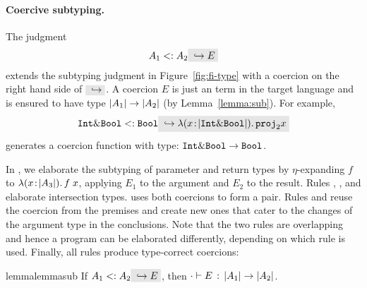 
\paragraph{Coercive subtyping.}

The judgment
\[
A_1 \subtype A_2 \yields E
\]
extends the subtyping judgment in Figure~\ref{fig:fi-type} with a coercion
on the right hand side of $ \yields {} $. A coercion $ E $ is just an term
in the target language and is ensured to have type
$ \lvert A_1 \rvert \to \lvert A_2 \rvert $ (by Lemma~\ref{lemma:sub}). For example,
\[
\code{Int} \inter \code{Bool} \subtype \code{Bool} \yields {\lamty x {\im {\code{Int} \inter \code{Bool}}} {\proj 2 x}}
\]
generates a coercion function with type: $\texttt{Int} \& \texttt{Bool} \to \texttt{Bool}$.

In , we elaborate the subtyping of
parameter and return types by $\eta$-expanding $f$ to $\lambda (x \!:\! \lvert A_3 \rvert).\, f \; x$, applying $E_1$ to the argument and $E_2$ to the result. Rules
, , and
 elaborate intersection types.
 uses both coercions to form a pair. Rules
 and  reuse the coercion
from the premises and create new ones that cater to the changes of the argument
type in the conclusions. Note that the two rules are overlapping and
hence a program can be elaborated differently, depending on which rule
is used. Finally, all rules produce type-correct coercions:



\begin{restatable}{lemma}{lemmasub}
  \label{lemma:sub}
  If $ A_1 \subtype A_2 \yields E $, then $ \cdot \vdash E \ \!:\! \ \lvert A_1 \rvert \to \lvert A_2 \rvert $.
\end{restatable}

